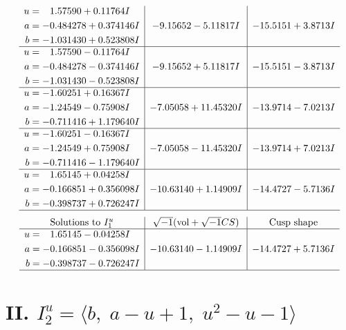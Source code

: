 \documentclass[1p]{elsarticle_modified}
\theoremstyle{definition}
\newcommand{\I}{\sqrt{-1}}
\begin{document}
$$\begin{array}{c|c|c}
\begin{aligned}
u &= \phantom{-}1.57590 + 0.11764 I \\
a &= -0.484278 + 0.374146 I \\
b &= -1.031430 + 0.523808 I\end{aligned}
 & -9.15652 - 5.11817 I & -15.5151 + 3.8713 I \\ \hline\begin{aligned}
u &= \phantom{-}1.57590 - 0.11764 I \\
a &= -0.484278 - 0.374146 I \\
b &= -1.031430 - 0.523808 I\end{aligned}
 & -9.15652 + 5.11817 I & -15.5151 - 3.8713 I \\ \hline\begin{aligned}
u &= -1.60251 + 0.16367 I \\
a &= -1.24549 - 0.75908 I \\
b &= -0.711416 + 1.179640 I\end{aligned}
 & -7.05058 + 11.45320 I & -13.9714 - 7.0213 I \\ \hline\begin{aligned}
u &= -1.60251 - 0.16367 I \\
a &= -1.24549 + 0.75908 I \\
b &= -0.711416 - 1.179640 I\end{aligned}
 & -7.05058 - 11.45320 I & -13.9714 + 7.0213 I \\ \hline\begin{aligned}
u &= \phantom{-}1.65145 + 0.04258 I \\
a &= -0.166851 + 0.356098 I \\
b &= -0.398737 + 0.726247 I\end{aligned}
 & -10.63140 + 1.14909 I & -14.4727 - 5.7136 I\\
 \hline 
 \end{array}$$\newpage$$\begin{array}{c|c|c}  
\text{Solutions to }I^u_{1}& \I (\text{vol} + \sqrt{-1}CS) & \text{Cusp shape}\\
 \hline 
\begin{aligned}
u &= \phantom{-}1.65145 - 0.04258 I \\
a &= -0.166851 - 0.356098 I \\
b &= -0.398737 - 0.726247 I\end{aligned}
 & -10.63140 - 1.14909 I & -14.4727 + 5.7136 I\\
 \hline 
 \end{array}$$\newpage\newpage\renewcommand{\arraystretch}{1}
\centering \section*{II. $I^u_{2}= \langle b,\;a- u+1,\;u^2- u-1 \rangle$}
\end{document}
